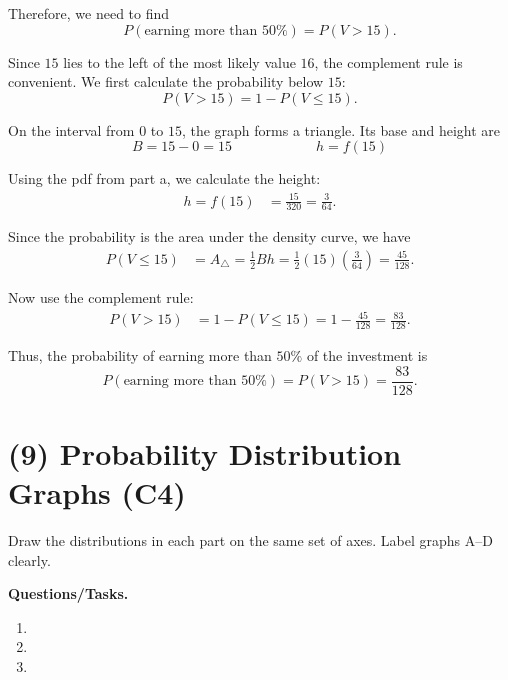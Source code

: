 	Therefore, we need to find
	\[
	P(\text{earning more than }50\%)=P(V>15).
	\]
	
	Since \(15\) lies to the left of the most likely value \(16\), the complement rule is convenient. We first calculate the probability below \(15\):
	\[
	P(V>15)=1-P(V\le 15).
	\]
	
	On the interval from $0$ to $15$, the graph forms a triangle. Its base and height are
	\[
	B=15-0=15
	\qquad \qquad \qquad
	h=f(15)
	\]
	
	Using the pdf from part a, we calculate the height:
	\[
	\begin{aligned}
		h=f(15)
		&=\frac{15}{320}
		=\frac{3}{64}.
	\end{aligned}
	\]
	
	Since the probability is the area under the density curve, we have
	\[
	\begin{aligned}
		P(V\le 15)
		&=A_{\triangle}
		=\frac{1}{2}Bh
		=\frac{1}{2}(15)\left(\frac{3}{64}\right)
		=\frac{45}{128}.
	\end{aligned}
	\]
	
	Now use the complement rule:
	\[
	\begin{aligned}
		P(V>15)
		&=1-P(V\le 15)
		=1-\frac{45}{128}
		=\frac{83}{128}.
	\end{aligned}
	\]
	
	Thus, the probability of earning more than \(50\%\) of the investment is
	\[
	P(\text{earning more than }50\%)=P(V>15)=\frac{83}{128}.
	\]
	
	
	
	\section{(9) Probability Distribution Graphs (C4)}
	\label{sec:probability-distribution-graphs-c4}
	
	Draw the distributions in each part on the same set of axes. Label graphs A--D clearly.
	
	\textbf{Questions/Tasks.}
	\begin{enumerate}[label=\textbf{\alph*)}]
		\item {}
		\item {}
		\item {}
	\end{enumerate}
	
